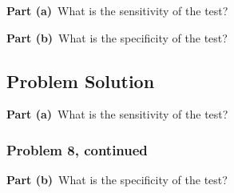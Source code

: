 \documentclass[12pt]{article}
\theoremstyle{definition}
\begin{document}
\bigskip
\noindent
{\bf Part (a)}\ What is the sensitivity of the test?

\bigskip
\noindent
{\bf Part (b)}\ What is the specificity of the test?


\subsection*{Problem Solution}

\noindent
{\bf Part (a)}\ What is the sensitivity of the test?



\newpage
\subsubsection*{Problem 8, continued}

\vspace{2in}
\noindent
{\bf Part (b)}\ What is the specificity of the test?
\end{document}

